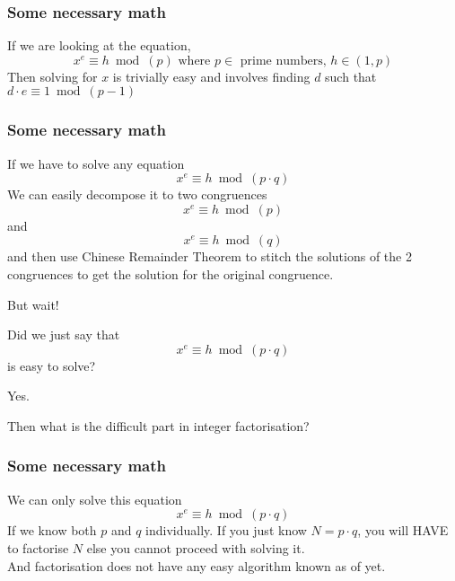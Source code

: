 \documentclass[11pt]{beamer}
\begin{document}
  \begin{frame}
    \frametitle{Some necessary math}
      If we are looking at the equation, \[x^e\equiv h \bmod(p)\text{ where $p\in$ prime numbers, $h\in(1, p)$}\]
      Then solving for \(x\) is trivially easy and involves finding \(d\) such that \(d\cdot e \equiv 1 \bmod(p-1)\)
  \end{frame}

  \begin{frame}
    \frametitle{Some necessary math}
      If we have to solve any equation
      \[x^e\equiv h \bmod(p\cdot q)\]
      We can easily decompose it to two congruences \[x^e\equiv h \bmod(p)\] and \[x^e\equiv h \bmod( q)\] and then use Chinese Remainder Theorem to stitch the solutions of the 2 congruences to get the solution for the original congruence.
  \end{frame}

  \begin{frame}
    But wait!

    Did we just say that \[x^e\equiv h \bmod(p\cdot q)\] is easy to solve?\pause

    Yes. \\\pause

    Then what is the difficult part in integer factorisation? \\
  \end{frame}

  \begin{frame}
    \frametitle{Some necessary math}
      We can only solve this equation\[x^e\equiv h \bmod(p\cdot q)\]
      If we know both $p$ and $q$ individually. If you just know \(N= p\cdot q\), you will HAVE to factorise $N$ else you cannot proceed with solving it. \\\pause And factorisation does not have any easy algorithm known as of yet.
      
  \end{frame}
\end{document}
